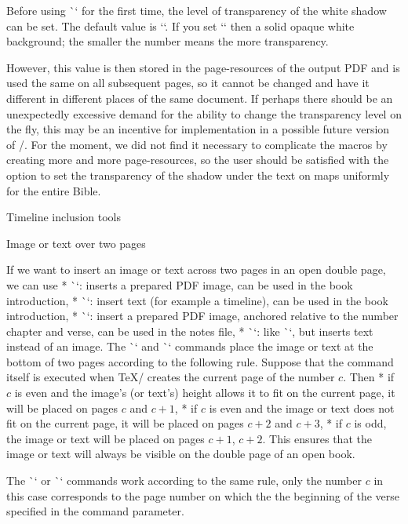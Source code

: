 {{Before using \`\putstext` for the first time, the level of transparency of the white shadow can be set.  The default value is `\def\shadowparameter{.1}`. 
If you set `\def\shadowparameter{1}` then a solid opaque white background; the smaller the number means the more transparency. 

However, this value is then stored in the page-resources of the output PDF and is used 
the same  on all subsequent pages, so it cannot be changed and have it  different in 
different places of the same document. 
If perhaps there should be an unexpectedly excessive 
demand for the ability to change the transparency level on the fly, this may be an incentive for 
implementation in a possible future version of \OpBible/.
For the moment, we did not find it necessary to complicate the macros by creating more and more 
page-resources, so the user should be satisfied with the option to set the transparency of the 
shadow under the text on maps uniformly for the entire Bible.  



\sec Timeline inclusion tools

\secc[spanimage] Image or text over two pages

If we want to insert an image or text across two pages in an open double page, we can
use
\begitems
* \`\insertSpanImage`: inserts a prepared PDF image, can be used in the book introduction,
* \`\insertSpanText`: insert text (for example a timeline), can be used in the book introduction,
* \`\putSpanImage`: insert a prepared PDF image, anchored relative to the number
   chapter and verse, can be used in the notes file,
* \`\putSpanText`: like \`\putSpanImage`, but inserts text instead of an image.
\enditems
The \`\insertSpanImage` and \`\insertSpanText` commands place the image or text 
at the bottom of two pages according to the following rule. Suppose that
the command itself is executed when \TeX/ creates the current page of
the number $c$. Then
\begitems
* if $c$ is even and the image's (or text's) height allows it to fit on the current page,
  it will be placed on pages $c$ and $c+1$,
* if $c$ is even and the image or text does not fit on the current page,
  it will be placed on pages $c+2$ and $c+3$,
* if $c$ is odd, the image or text will be placed on pages $c+1$, $c+2$.
\enditems
This ensures that the image or text will always be visible on the double page
of an open book.

The \`\putSpanImage` or \`\putSpanText` commands work according to the same rule,
only the number $c$ in this case corresponds to the page number on which the
the beginning of the verse specified in the command parameter.

}}
